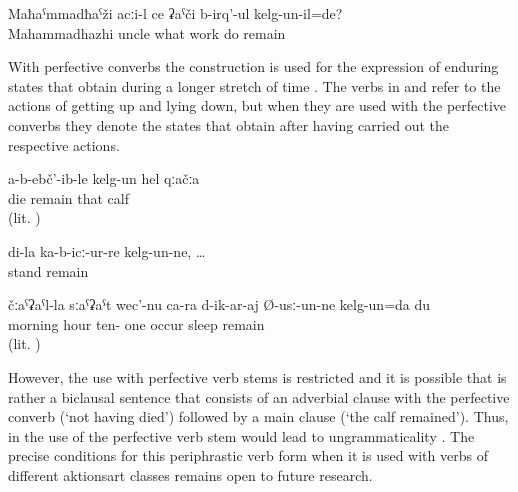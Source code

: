 \begin{exe}
	\ex	\label{ex:‎Which work was uncle Mahammadhazhi doing}
	\gll	Maħaˁmmadħaˁži	acːi-l	ce	ʡaˁči	b-irq'-ul	kelg-un-il=de?	\\
		Mahammadhazhi	uncle	what	work	do	remain\\
	\glt	{}
\end{exe}
%
With perfective converbs the construction is used for the expression of enduring states that obtain during a longer stretch of time . The verbs in  and  refer to the actions of getting up and lying down, but when they are used with the perfective converbs they denote the states that obtain after having carried out the respective actions. 
%
\begin{exe}
	\ex	\label{ex:The calf stayed alive periphrastic}
	\gll	a-b-ebč'-ib-le	kelg-un	hel	qːačːa\\
		die	remain	that	calf\\
	\glt	{} (lit. )

	\ex	\label{ex:‎‎‎Mine (i.e. my stick) remained upright standing}
	\gll	di-la	ka-b-icː-ur-re	kelg-un-ne,	\ldots\\
			stand	remain\\
	\glt	{}

	\ex	\label{ex:In the morning, I slept until eleven}
	\gll	čːaˁʡaˁl-la	sːaˁʡaˁt	wec'-nu	ca-ra	d-ik-ar-aj	Ø-usː-un-ne	kelg-un=da	du\\
		morning	hour	ten-	one	occur	sleep		remain	\\
	\glt	{} (lit. )
\end{exe}

However, the use with perfective verb stems is restricted and it is possible that  is rather a biclausal sentence that consists of an adverbial clause with the perfective converb (`not having died') followed by a main clause (`the calf remained'). Thus, in  the use of the perfective verb stem would lead to ungrammaticality . The precise conditions for this periphrastic verb form when it is used with verbs of different aktionsart classes  remains open to future research.

